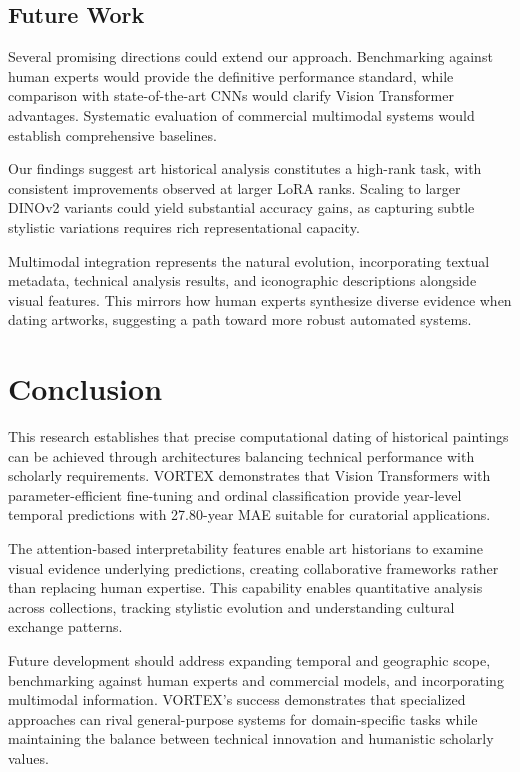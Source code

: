 \documentclass[10pt,twocolumn,letterpaper]{article}
\begin{document}
\subsection{Future Work}

Several promising directions could extend our approach. Benchmarking against human experts would provide the definitive performance standard, while comparison with state-of-the-art CNNs would clarify Vision Transformer advantages. Systematic evaluation of commercial multimodal systems would establish comprehensive baselines.

Our findings suggest art historical analysis constitutes a high-rank task, with consistent improvements observed at larger LoRA ranks. Scaling to larger DINOv2 variants could yield substantial accuracy gains, as capturing subtle stylistic variations requires rich representational capacity.

Multimodal integration represents the natural evolution, incorporating textual metadata, technical analysis results, and iconographic descriptions alongside visual features. This mirrors how human experts synthesize diverse evidence when dating artworks, suggesting a path toward more robust automated systems.

\section{Conclusion}

This research establishes that precise computational dating of historical paintings can be achieved through architectures balancing technical performance with scholarly requirements. VORTEX demonstrates that Vision Transformers with parameter-efficient fine-tuning and ordinal classification provide year-level temporal predictions with 27.80-year MAE suitable for curatorial applications.

The attention-based interpretability features enable art historians to examine visual evidence underlying predictions, creating collaborative frameworks rather than replacing human expertise. This capability enables quantitative analysis across collections, tracking stylistic evolution and understanding cultural exchange patterns.

Future development should address expanding temporal and geographic scope, benchmarking against human experts and commercial models, and incorporating multimodal information. VORTEX's success demonstrates that specialized approaches can rival general-purpose systems for domain-specific tasks while maintaining the balance between technical innovation and humanistic scholarly values.

{\small


}
\end{document}
